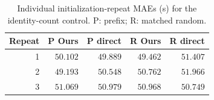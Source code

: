 \begin{table}[t]
\centering\footnotesize\setlength{\tabcolsep}{4pt}
\caption{Individual initialization-repeat MAEs (s) for the identity-count control. P: prefix; R: matched random.}\label{tab:coverage_seeds}
\begin{tabular}{rrrrr}\toprule
Repeat & P Ours & P direct & R Ours & R direct\\\midrule
1 & $50.102$ & $49.889$ & $49.462$ & $51.407$\\
2 & $49.193$ & $50.548$ & $50.762$ & $51.966$\\
3 & $51.069$ & $50.979$ & $50.968$ & $50.749$\\
\bottomrule\end{tabular}
\end{table}
